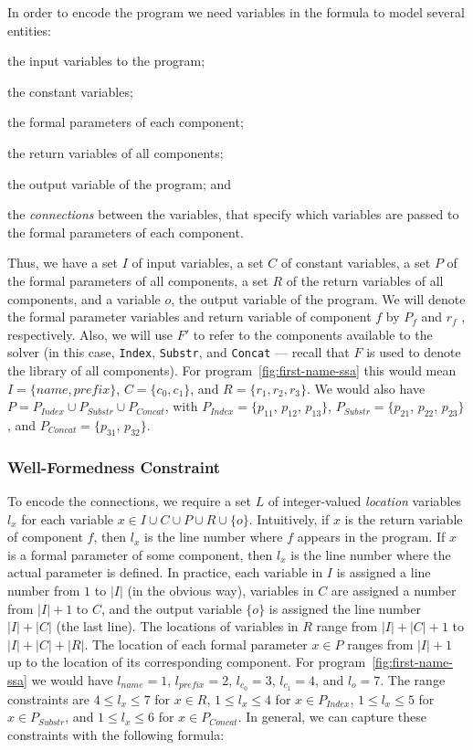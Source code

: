 In order to encode the program we need variables in the formula to model several
entities:
\begin{enumerate*}[(1)]
\item the input variables to the program;
\item the constant variables;
\item the formal parameters of each component;
\item the return variables of all components;
\item the output variable of the program; and
\item the \textit{connections} between the variables, that specify which
  variables are passed to the formal parameters of each component.
\end{enumerate*}
Thus, we have a set $I$ of input variables, a set $C$ of constant variables, a
set $P$ of the formal parameters of all components, a set $R$ of the return
variables of all components, and a variable $o$, the output variable of the
program. We will denote the formal parameter variables and return variable of
component $f$ by $P_f$ and $r_f$ , respectively. Also, we will use $F'$ to refer
to the components available to the solver (in this case, \lstinline{Index},
\lstinline{Substr}, and \lstinline{Concat} --- recall that $F$ is used to denote
the library of all components).
For program~\ref{fig:first-name-ssa} this would mean $I = \{name, prefix\}$,
$C = \{c_0, c_1\}$, and $R = \{r_1, r_2, r_3\}$. We would also have
$P = P_{Index} \cup P_{Substr} \cup P_{Concat}$, with
$P_{Index} = \{p_{11}$, $p_{12}$, $p_{13}\}$,
$P_{Substr} = \{p_{21}$, $p_{22}$, $p_{23}\}$, and
$P_{Concat} = \{p_{31}$, $p_{32}\}$.

\subsubsection{Well-Formedness Constraint}
\label{sec:wfp-constraint}

To encode the connections, we require a set $L$ of integer-valued
\textit{location} variables $l_x$ for each variable $x \in I \cup C \cup P \cup
R \cup \{o\}$. Intuitively, if $x$ is the return variable of component $f$, then
$l_x$ is the line number where $f$ appears in the program. If $x$ is a formal
parameter of some component, then $l_x$ is the line number where the actual
parameter is defined. In practice, each variable in $I$ is assigned a line
number from $1$ to $|I|$ (in the obvious way), variables in $C$ are assigned
a number from $|I| + 1$ to $C$, and the output variable $\{o\}$ is assigned the
line number $|I| + |C|$ (the last line). The locations of variables in $R$ range
from $|I| + |C| + 1$ to $|I| + |C| + |R|$. The location of each formal parameter
$x \in P$ ranges from $|I| + 1$ up to the location of its corresponding
component.
For program~\ref{fig:first-name-ssa} we would have
$l_{name} = 1$, $l_{prefix} = 2$,
$l_{c_0} = 3$, $l_{c_1} = 4$,
and $l_o = 7$.
The range constraints are
$4 \leq l_x \leq 7$ for $x \in R$,
$1 \leq l_x \leq 4$ for $x \in P_{Index}$,
$1 \leq l_x \leq 5$ for $x \in P_{Substr}$, and
$1 \leq l_x \leq 6$ for $x \in P_{Concat}$.
In general, we can capture these constraints with the following formula:

